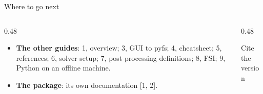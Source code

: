 \begin{frame}{Where to go next}
\begin{columns}[T]
\begin{column}{0.48\textwidth}
\begin{itemize}\small
  \item \textbf{The other guides}: 1, overview; 3, GUI to pyfs;
        4, cheatsheet; 5, references; 6, solver setup;
        7, post-processing definitions; 8, FSI;
        9, Python on an offline machine.
  \item \textbf{The package}: its own documentation [1, 2].
\end{itemize}
\end{column}
\begin{column}{0.48\textwidth}
\begin{block}{Cite the version}
\small \pkgcitation
\end{block}
\end{column}
\end{columns}
\end{frame}
